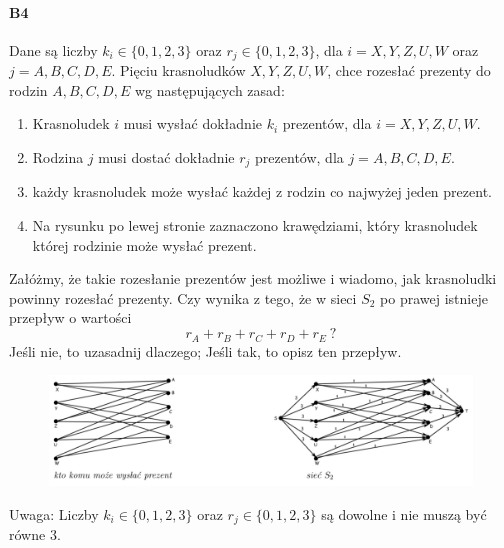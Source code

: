 \documentclass[a4paper,12pt]{article}
\theoremstyle{definition}%
\theoremstyle{definition}
\theoremstyle{problem}
\begin{document}
\paragraph{B4} Dane są liczby $k_i\in \{0,1,2,3\}$ oraz $r_j\in \{0,1,2,3\}$, dla $i = X,Y,Z,U,W$ oraz $j = A,B,C,D,E$. Pięciu krasnoludków $X, Y , Z, U, W$, chce rozesłać prezenty do rodzin $A, B, C, D, E$ wg następujących zasad:
\begin{enumerate}[label=\alph*)]
\item Krasnoludek $i$ musi wysłać dokładnie $k_i$ prezentów, dla $i = X,Y,Z,U,W$.
\item Rodzina $j$ musi dostać dokładnie $r_j$ prezentów, dla $j = A,B,C,D,E$.
\item każdy krasnoludek może wysłać każdej z rodzin co najwyżej jeden prezent.
\item Na rysunku po lewej stronie zaznaczono krawędziami, który krasnoludek której rodzinie może wysłać prezent.
\end{enumerate}
Załóżmy, że takie rozesłanie prezentów jest możliwe i wiadomo, jak krasnoludki powinny rozesłać prezenty. Czy wynika z tego, że w sieci $S_2$ po prawej istnieje przepływ o wartości $$r_A + r_B + r_C + r_D + r_E\ ?$$ Jeśli nie, to uzasadnij dlaczego; Jeśli tak, to opisz ten przepływ.
\begin{figure}[H]
\centering
\includegraphics[width=.9\textwidth]{img/7_B4}
\end{figure}

Uwaga: Liczby $k_i \in \{0, 1, 2, 3\}$ oraz $r_j \in \{0, 1, 2, 3\}$ są dowolne i nie muszą być równe $3$.
\end{document}
